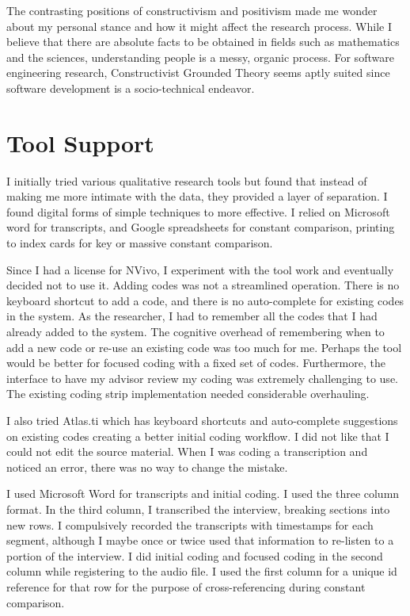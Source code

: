 The contrasting positions of constructivism and positivism made me wonder about my personal stance and how it might affect the research process. While I believe that there are absolute facts to be obtained in fields such as mathematics and the sciences, understanding people is a messy, organic process. For software engineering research, Constructivist Grounded Theory seems aptly suited since software development is a socio-technical endeavor.

\section{Tool Support}
I initially tried various qualitative research tools but found that instead of making me more intimate with the data, they provided a layer of separation. I found digital forms of simple techniques to more effective. I relied on Microsoft word for transcripts, and Google spreadsheets for constant comparison, printing to index cards for key or massive constant comparison.

Since I had a license for NVivo, I experiment with the tool work and eventually decided not to use it. Adding codes was not a streamlined operation. There is no keyboard shortcut to add a code, and there is no auto-complete for existing codes in the system. As the researcher, I had to remember all the codes that I had already added to the system. The cognitive overhead of remembering when to add a new code or re-use an existing code was too much for me. Perhaps the tool would be better for focused coding with a fixed set of codes. Furthermore, the interface to have my advisor review my coding was extremely challenging to use. The existing coding strip implementation needed considerable overhauling.

I also tried Atlas.ti which has keyboard shortcuts and auto-complete suggestions on existing codes creating a better initial coding workflow. I did not like that I could not edit the source material. When I was coding a transcription and noticed an error, there was no way to change the mistake. 

I used Microsoft Word for transcripts and initial coding. I used the three column format. In the third column, I transcribed the interview, breaking sections into new rows. I compulsively recorded the transcripts with timestamps for each segment, although  I maybe once or twice used that information to re-listen to a portion of the interview.  I did initial coding and focused coding in the second column while registering to the audio file. I used the first column for a unique id reference for that row for the purpose of cross-referencing during constant comparison. 

